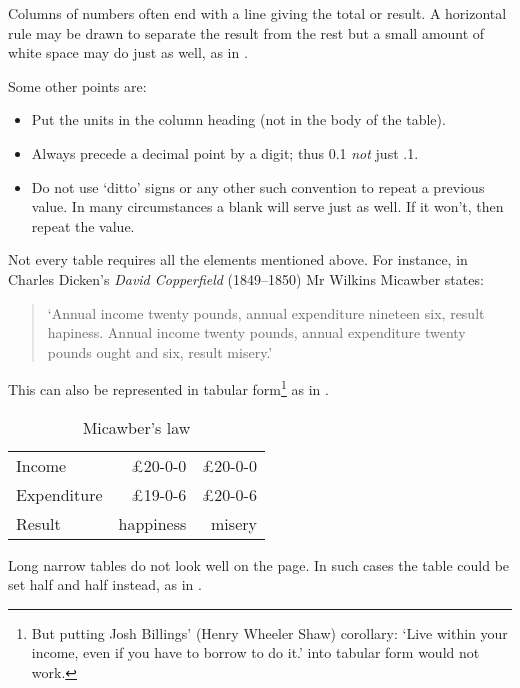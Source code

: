     Columns of numbers often end with a line giving the total or result.
A horizontal rule may be drawn to separate the result 
from the rest but
a small amount of white space may do just as well, as in .

Some other points are:
 \begin{itemize}
   \item Put the units in the column heading (not in the body of
           the table).
   \item Always precede a decimal point by a digit; thus 0.1
       \emph{not} just .1.
   \item Do not use `ditto' signs or any other such convention to
       repeat a previous value. In many circumstances a blank
       will serve just as well. If it won't, then repeat the value.
 \end{itemize}

    Not every table requires all the elements mentioned above.
For instance, in Charles Dicken's \emph{David Copperfield} (1849--1850) 
Mr Wilkins Micawber states:
\begin{quote}
`Annual income twenty pounds, annual expenditure nineteen six, 
result hapiness.
Annual income twenty pounds, annual expenditure twenty pounds ought and six, 
result misery.'
\end{quote}
This can also be represented in tabular 
form\footnote{%
But putting Josh Billings' (Henry Wheeler Shaw) corollary: 
`Live within your income, even if you have to borrow to do it.'
into tabular form would not work.}
 as in .

\begin{table}
\centering
\caption{Micawber's law} \label{tab:micawber}
\begin{tabular}{lrr} \toprule
Income     & \pounds{20-0-0}  & \pounds{20-0-0} \\
Expenditure & \pounds{19-0-6} & \pounds{20-0-6} \\ \addlinespace
Result      & happiness & misery \\ \bottomrule
\end{tabular}
\end{table}

    Long narrow tables do not look well on the page. In such cases
the table could be set half and half 
instead, as in .

